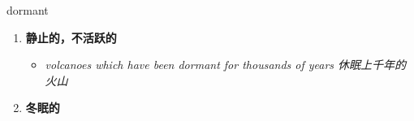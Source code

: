 
\begin{frame}
{\huge dormant}
\begin{center}
\begin{enumerate}\Large
  \item \textbf{静止的，不活跃的}
  \begin{itemize}
    \item \em{\Large{volcanoes which have been dormant for thousands of years 休眠上千年的火山}}
  \end{itemize}
  \item \textbf{冬眠的}
\end{enumerate}
\end{center}
\end{frame}
